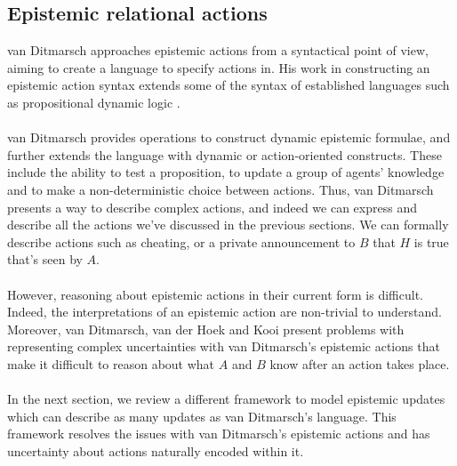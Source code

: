 \subsection{Epistemic relational actions} \label{epi_acts}
van Ditmarsch approaches epistemic actions from a syntactical point of view,
aiming to create a language to specify actions in.
His work in constructing an epistemic action syntax extends some of the
syntax of established languages such as propositional dynamic
logic \cite{ditmarsch99knowledge,ditmarsch2002dga}.\\
\\
van Ditmarsch provides operations to construct dynamic epistemic formulae, and
further extends the language with dynamic or action-oriented constructs.
These include the ability to test a proposition, to update a group of agents'
knowledge and to make a non-deterministic choice between actions.
Thus, van Ditmarsch presents a way to describe complex actions, and indeed we can
express and describe all the actions we've discussed in the previous sections.
We can formally describe actions such as cheating, or a private
announcement to $B$ that $H$ is true that's seen by $A$.\\
\\
However, reasoning about epistemic actions in their current form is difficult.
Indeed, the interpretations of an epistemic action are non-trivial to
understand.
Moreover, van Ditmarsch, van der Hoek and Kooi present problems with
representing complex uncertainties with van Ditmarsch's epistemic actions that make it difficult
to reason about what $A$ and $B$ know after an action takes place.\\
\\
In the next section, we review a different framework to model epistemic updates
which can describe as many updates as van Ditmarsch's language.
This framework resolves the issues with van Ditmarsch's epistemic actions and
has uncertainty about actions naturally encoded within it.
